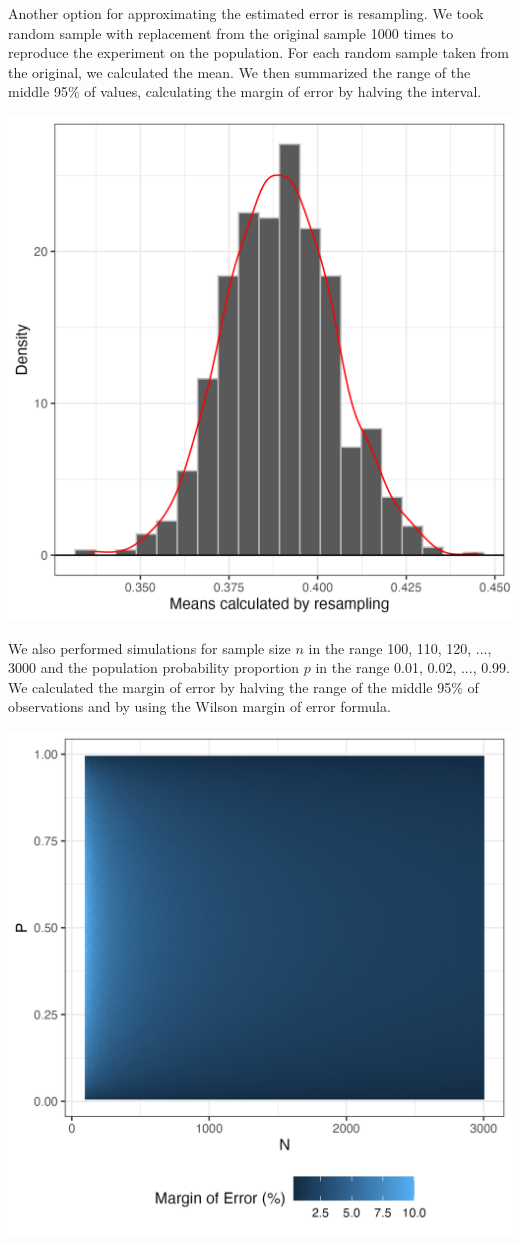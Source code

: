 \documentclass{article}\usepackage[]{graphicx}\usepackage[]{xcolor}
\newenvironment{Figure}
  {\par\medskip\noindent\minipage{\linewidth}}
  {\endminipage\par\medskip}
\begin{document}
\begin{multicols}{2}
Another option for approximating the estimated error is resampling. We took random sample with replacement from the original sample 1000 times to reproduce the experiment on the population. For each random sample taken from the original, we calculated the mean. We then summarized the range of the middle 95\% of values, calculating the margin of error by halving the interval.

\begin{Figure}
 \centering
 \includegraphics[width = 0.7\linewidth]{resample.png}
 \label{fig:res}
\end{Figure}

We also performed simulations for sample size $n$ in the range {100, 110, 120, ..., 3000} and the population probability proportion $p$ in the range {0.01, 0.02, ..., 0.99}. We calculated the margin of error by halving the range of the middle 95\% of observations and by using the Wilson margin of error formula.

\begin{Figure}
 \centering
 \includegraphics[width =0.7\linewidth]{error.png}
 \label{fig:err}
\end{Figure}


\end{multicols}
\end{document}
